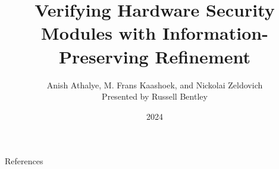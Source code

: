 \documentclass{beamer}
\title{Verifying Hardware Security Modules with Information-Preserving Refinement}
\author{Anish Athalye, M. Frans Kaashoek, and Nickolai Zeldovich\\\vspace{1cm}Presented by Russell Bentley}
\institute{Stony Brook}
\date{2024}
\begin{document}
\frame{\titlepage}







\begin{frame}[allowframebreaks]{References}
    \tiny
    \printbibliography
\end{frame}
\end{document}
